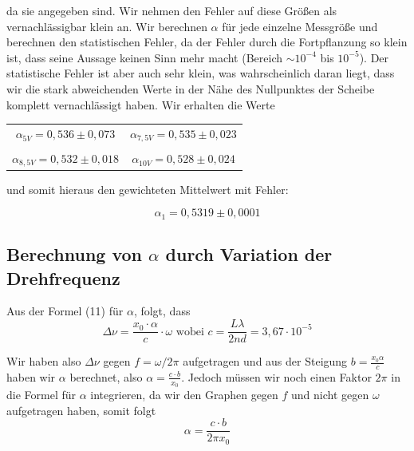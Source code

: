da sie angegeben sind. Wir nehmen den Fehler auf diese Größen als vernachlässigbar klein an. Wir berechnen $\alpha$ für jede einzelne Messgröße und berechnen den statistischen Fehler, da der Fehler durch die Fortpflanzung so klein ist, dass seine Aussage keinen Sinn mehr macht (Bereich $\sim 10^{-4}$  bis  $10^{-5}$). Der statistische Fehler ist aber auch sehr klein, was wahrscheinlich daran liegt, dass wir die stark abweichenden Werte in der Nähe des Nullpunktes der Scheibe komplett vernachlässigt haben. Wir erhalten die Werte

\begin{center}
\begin{tabular}[H]{c c}
	$\alpha_{5V} = 0,536 \pm 0,073$ & $\alpha_{7,5V} = 0,535 \pm 0,023$\\
	 & \\
	$\alpha_{8,5V} = 0,532 \pm 0,018$ & $\alpha_{10V} = 0,528 \pm 0,024$
\end{tabular}
\end{center}

und somit hieraus den gewichteten Mittelwert mit Fehler:

$$\boxed{\alpha_1 =0,5319 \pm 0,0001}$$

\clearpage

\subsection{Berechnung von $\alpha$ durch Variation der Drehfrequenz}

Aus der Formel (11) für $\alpha$, folgt, dass $$\Delta\nu = \frac{x_0\cdot\alpha}{c}\cdot\omega \text{\ \ wobei \ \ }
c = \frac{L\lambda}{2nd} = 3,67\cdot 10^{-5}$$

Wir haben also $\Delta\nu$ gegen $f=\omega/2\pi$ aufgetragen und aus der Steigung $b=\frac{x_0\alpha}{c}$ haben wir $\alpha$ berechnet, also $\alpha=\frac{c\cdot b}{x_0}$. Jedoch müssen wir noch einen Faktor $2\pi$ in die Formel für $\alpha$ integrieren, da wir den Graphen gegen $f$ und nicht gegen $\omega$ aufgetragen haben, somit folgt $$\alpha = \frac{c\cdot b}{2\pi x_0}$$

